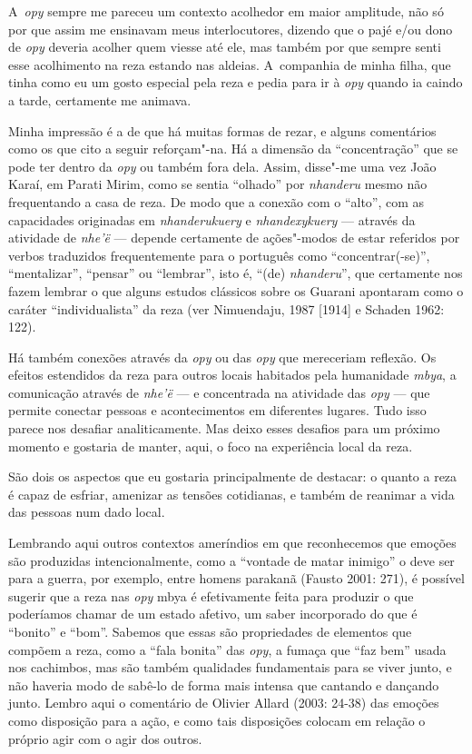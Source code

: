 A~\emph{opy} sempre me pareceu um contexto acolhedor em maior amplitude, não só
por que assim me ensinavam meus interlocutores, dizendo que o pajé e/ou
dono de \emph{opy} deveria acolher quem viesse até ele, mas também por que
sempre senti esse acolhimento na reza estando nas aldeias. A~companhia
de minha filha, que tinha como eu um gosto especial pela reza e pedia
para ir à \emph{opy} quando ia caindo a tarde, certamente me animava.

Minha impressão é a de que há muitas formas de rezar, e alguns
comentários como os que cito a seguir reforçam"-na. Há a dimensão da
``concentração'' que se pode ter dentro da \emph{opy} ou também fora dela.
Assim, disse"-me uma vez João Karaí, em Parati Mirim, como se sentia
``olhado'' por \emph{nhanderu} mesmo não frequentando a casa de reza. De modo que
a conexão com o ``alto'', com as capacidades originadas em \emph{nhanderukuery} e
\emph{nhandexykuery} --- através da atividade de \emph{nhe’ë} --- depende certamente de
ações"-modos de estar referidos por verbos traduzidos frequentemente
para o português como ``concentrar(-se)'',  ``mentalizar'', ``pensar'' ou
``lembrar'', isto é, ``(de) \emph{nhanderu}'', que certamente nos fazem lembrar o
que alguns estudos clássicos sobre os Guarani apontaram como o caráter
``individualista'' da reza (ver Nimuendaju, 1987 [1914] e Schaden 1962:
122). 

Há também conexões através da \emph{opy} ou das \emph{opy} que mereceriam reflexão. Os
efeitos estendidos da reza para outros locais habitados pela humanidade
\emph{mbya}, a comunicação através de \emph{nhe’ë} --- e concentrada na atividade das
\emph{opy} --- que permite conectar pessoas e acontecimentos em diferentes
lugares. Tudo isso parece nos desafiar analiticamente. Mas deixo esses
desafios para um próximo momento e gostaria de manter, aqui, o foco na
experiência local da reza.

São dois os aspectos que eu gostaria principalmente de destacar: o
quanto a reza é capaz de esfriar, amenizar as tensões cotidianas, e
também de reanimar a vida das pessoas num dado local.

Lembrando aqui outros contextos ameríndios em que reconhecemos que
emoções são produzidas intencionalmente, como a ``vontade de matar
inimigo'' o deve ser para a guerra, por exemplo, entre homens parakanã
(Fausto 2001: 271), é possível sugerir que a reza nas \emph{opy} mbya é
efetivamente feita para produzir o que poderíamos chamar de um estado
afetivo, um saber incorporado do que é ``bonito'' e ``bom''. Sabemos que essas
são propriedades de elementos que compõem a reza, como a ``fala bonita''
das \emph{opy}, a fumaça que ``faz bem'' usada nos cachimbos, mas são também
qualidades fundamentais para se viver junto, e não haveria modo de
sabê-lo de forma mais intensa que cantando e dançando junto. Lembro
aqui o comentário de Olivier Allard (2003: 24-38) das emoções como
disposição para a ação, e como tais disposições colocam em relação o
próprio agir com o agir dos outros.


